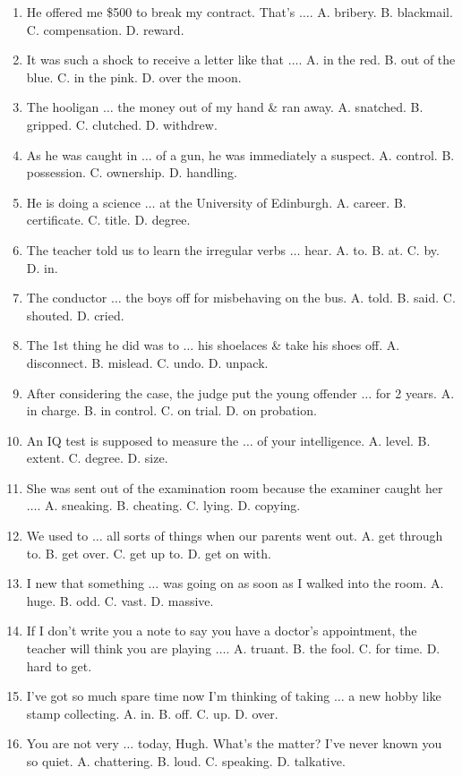 \documentclass{article}
\numberwithin{equation}{section}
\begin{document}
\begin{enumerate}[leftmargin=5mm]
	\item He offered me \$500 to break my contract. That's $\ldots$. A. bribery. B. blackmail. C. compensation. D. reward.
	\item It was such a shock to receive a letter like that $\ldots$. A. in the red. B. out of the blue. C. in the pink. D. over the moon.
	\item The hooligan $\ldots$ the money out of my hand \& ran away. A. snatched. B. gripped. C. clutched. D. withdrew.
	\item As he was caught in $\ldots$ of a gun, he was immediately a suspect. A. control. B. possession. C. ownership. D. handling.
	\item He is doing a science $\ldots$ at the University of Edinburgh. A. career. B. certificate. C. title. D. degree.
	\item The teacher told us to learn the irregular verbs $\ldots$ hear. A. to. B. at. C. by. D. in.
	\item The conductor $\ldots$ the boys off for misbehaving on the bus. A. told. B. said. C. shouted. D. cried.
	\item The 1st thing he did was to $\ldots$ his shoelaces \& take his shoes off. A. disconnect. B. mislead. C. undo. D. unpack.
	\item After considering the case, the judge put the young offender $\ldots$ for 2 years. A. in charge. B. in control. C. on trial. D. on probation.
	\item An IQ test is supposed to measure the $\ldots$ of your intelligence. A. level. B. extent. C. degree. D. size.
	\item She was sent out of the examination room because the examiner caught her $\ldots$. A. sneaking. B. cheating. C. lying. D. copying.
	\item We used to $\ldots$ all sorts of things when our parents went out. A. get through to. B. get over. C. get up to. D. get on with.
	\item I new that something $\ldots$ was going on as soon as I walked into the room. A. huge. B. odd. C. vast. D. massive.
	\item If I don't write you a note to say you have a doctor's appointment, the teacher will think you are playing $\ldots$. A. truant. B. the fool. C. for time. D. hard to get.
	\item I've got so much spare time now I'm thinking of taking $\ldots$ a new hobby like stamp collecting. A. in. B. off. C. up. D. over.
	\item You are not very $\ldots$ today, Hugh. What's the matter? I've never known you so quiet. A. chattering. B. loud. C. speaking. D. talkative.

\end{enumerate}
\end{document}
